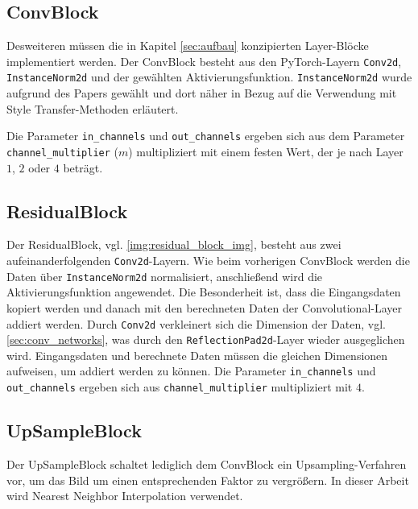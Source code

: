 \subsection{ConvBlock}

Desweiteren müssen die in Kapitel \ref{sec:aufbau} konzipierten Layer-Blöcke implementiert werden. Der ConvBlock besteht aus den PyTorch-Layern \texttt{Conv2d}, \texttt{InstanceNorm2d} und der gewählten Aktivierungsfunktion. \texttt{InstanceNorm2d} wurde aufgrund des Papers \cite{DBLP:journals/corr/UlyanovVL16} gewählt und dort näher in Bezug auf die Verwendung mit Style Transfer-Methoden erläutert.

Die Parameter \texttt{in_channels} und \texttt{out_channels} ergeben sich aus dem Parameter \texttt{channel_multiplier} ($ m $) multipliziert mit einem festen Wert, der je nach Layer $ 1 $, $ 2 $ oder $ 4 $ beträgt.

\subsection{ResidualBlock}

Der ResidualBlock, vgl. \ref{img:residual_block_img}, besteht aus zwei aufeinanderfolgenden \texttt{Conv2d}-Layern. Wie beim vorherigen ConvBlock werden die Daten über \texttt{InstanceNorm2d} normalisiert, anschließend wird die Aktivierungsfunktion angewendet. Die Besonderheit ist, dass die Eingangsdaten kopiert werden und danach mit den berechneten Daten der Convolutional-Layer addiert werden. Durch \texttt{Conv2d} verkleinert sich die Dimension der Daten, vgl. \ref{sec:conv_networks}, was durch den \texttt{ReflectionPad2d}-Layer wieder ausgeglichen wird. Eingangsdaten und berechnete Daten müssen die gleichen Dimensionen aufweisen, um addiert werden zu können. Die Parameter \texttt{in_channels} und \texttt{out_channels} ergeben sich aus \texttt{channel_multiplier} multipliziert mit $ 4 $.

\subsection{UpSampleBlock}

Der UpSampleBlock schaltet lediglich dem ConvBlock ein Upsampling-Verfahren vor, um das Bild um einen entsprechenden Faktor zu vergrößern. In dieser Arbeit wird Nearest Neighbor Interpolation verwendet.

